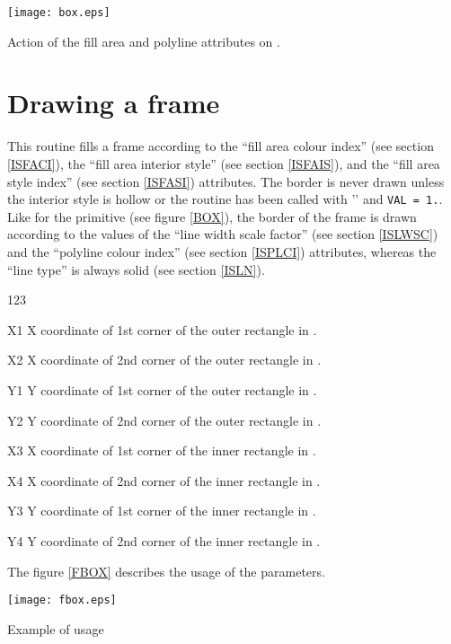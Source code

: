 \begin{Fighere}
\begin{center}\texttt{[image: box.eps]}\end{center}
\caption{Action of the fill area and polyline attributes on 
\protect{}.}
\label{BOX}
\end{Fighere}
 
\vfill\newpage

\section{Drawing a frame}
\Action
This routine fills a frame according to the ``fill area colour index''
(see section \ref{ISFACI}), the ``fill area interior style'' (see section
\ref{ISFAIS}), and the ``fill area style index'' (see section \ref{ISFASI})
attributes. The border is never drawn unless the interior
style is hollow or the routine  has been called with ''
and {\tt VAL = 1.}. Like for the  primitive (see figure \ref{BOX}),
the border of the frame is drawn according to the values of the ``line width
scale factor'' (see section \ref{ISLWSC}) and the ``polyline colour index''
(see section \ref{ISPLCI}) attributes, whereas the ``line type'' is always solid
(see section \ref{ISLN}).
\Pdesc
\begin{DLtt}{123}
\item[X1] X coordinate of 1st corner of the outer rectangle in \wc.
\item[X2] X coordinate of 2nd corner of the outer rectangle in \wc.
\item[Y1] Y coordinate of 1st corner of the outer rectangle in \wc.
\item[Y2] Y coordinate of 2nd corner of the outer rectangle in \wc.
\item[X3] X coordinate of 1st corner of the inner rectangle in \wc.
\item[X4] X coordinate of 2nd corner of the inner rectangle in \wc.
\item[Y3] Y coordinate of 1st corner of the inner rectangle in \wc.
\item[Y4] Y coordinate of 2nd corner of the inner rectangle in \wc.
\end{DLtt}
The figure \ref{FBOX} describes the usage of the  parameters.

\begin{Fighere}
\begin{center}\texttt{[image: fbox.eps]}\end{center}
\caption{Example of \protect{} usage}
\label{FBOX}
\end{Fighere}
 
